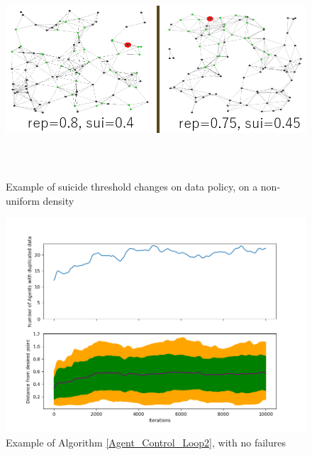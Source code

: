 \documentclass{UoYCSproject}
\begin{document}
\begin{figure}[htb]
\label{fig:Data9}
\begin{center}
\centering
\includegraphics[width=\linewidth, height=8cm]{"./MiscImgs/Rep_Sui_no_uniform_no_mo.png"}
\caption{Example of suicide threshold changes on data policy, on a non-uniform density}
\end{center}
\end{figure}

\begin{figure}[htb]
\label{fig:Data10}
\begin{center}
\centering
\includegraphics[width=\linewidth, height=8cm]{"./PrelimData/New_Replication_Scheme_No_Death_0.8r_0.45s.png"}
\caption{Example of Algorithm \ref{Agent_Control_Loop2}, with no failures}
\end{center}
\end{figure}
\end{document}
